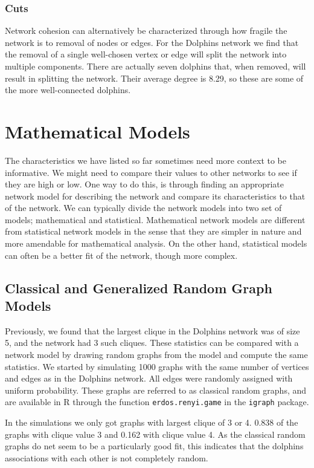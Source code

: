 \documentclass[11pt,a4paper]{article}
\begin{document}
\subsubsection{Cuts}
Network cohesion can alternatively be characterized through how fragile the network is to removal of nodes or edges.
For the Dolphins network we find that the removal of a single well-chosen vertex or edge will split the network into multiple components.
There are actually seven dolphins that, when removed, will result in splitting the network. Their average degree is 8.29, so these are some of the more well-connected dolphins.


\section{Mathematical Models}

The characteristics we have listed so far sometimes need more context to be informative. We might need to compare their values to other networks to see if they are high or low. One way to do this, is through finding an appropriate network model for describing the network and compare its characteristics to that of the network.
We can typically divide the network models into two set of models; mathematical and statistical. Mathematical network models are different from statistical network models in the sense that they are simpler in nature and more amendable for mathematical analysis. On the other hand, statistical models can often be a better fit of the network, though more complex.

\subsection{Classical and Generalized Random Graph Models}

Previously, we found that the largest clique in the Dolphins network was of size 5, and the network had 3 such cliques. 
These statistics can be compared with a network model by drawing random graphs from the model and compute the same statistics.
We started by simulating 1000 graphs with the same number of vertices and edges as in the Dolphins network. 
All edges were randomly assigned with uniform probability. These graphs are referred to as classical random graphs, and are available in R through the function \verb+erdos.renyi.game+ in the \verb+igraph+ package.

In the simulations we only got graphs with largest clique of 3 or 4. 0.838 of the graphs with clique value 3 and 0.162 with clique value 4. As the classical random graphs do net seem to be a particularly good fit, this indicates that the dolphins associations with each other is not completely random.
\end{document}
